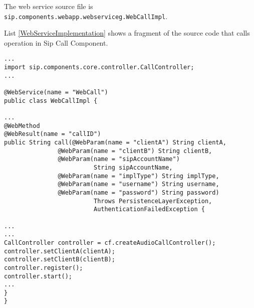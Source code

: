 The web service source file is \\ \texttt{sip.components.webapp.webserviceg.WebCallImpl}. 

List \ref{WebServiceImplementation} shows a fragment of the source code that calls operation in Sip Call Component. 

\lstset{language=Java}
\lstset{basicstyle=\small}
\begin{lstlisting}[frame=lines, float=!tbph, caption=Web Service implementation (fragment), label=WebServiceImplementation]
...
import sip.components.core.controller.CallController;
...

@WebService(name = "WebCall")
public class WebCallImpl {

...
@WebMethod
@WebResult(name = "callID")
public String call(@WebParam(name = "clientA") String clientA,
               @WebParam(name = "clientB") String clientB,
               @WebParam(name = "sipAccountName") 
                         String sipAccountName,
               @WebParam(name = "implType") String implType,
               @WebParam(name = "username") String username,
               @WebParam(name = "password") String password)
                         Throws PersistenceLayerException, 
                         AuthenticationFailedException {
                             
...
...
CallController controller = cf.createAudioCallController();
controller.setClientA(clientA);
controller.setClientB(clientB);
controller.register();
controller.start();
...
}
}
\end{lstlisting}


